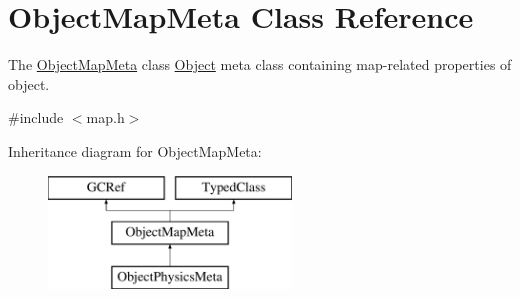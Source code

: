 \hypertarget{classObjectMapMeta}{}\section{Object\+Map\+Meta Class Reference}
\label{classObjectMapMeta}


The \hyperlink{classObjectMapMeta}{Object\+Map\+Meta} class \hyperlink{classObject}{Object} meta class containing map-\/related properties of object.  




{\ttfamily \#include $<$map.\+h$>$}

Inheritance diagram for Object\+Map\+Meta\+:\begin{figure}[H]
\begin{center}
\leavevmode
\includegraphics[height=3.000000cm]{classObjectMapMeta}
\end{center}
\end{figure}

